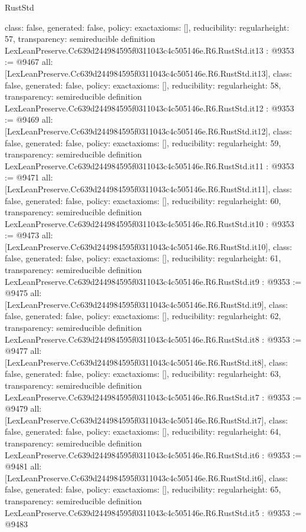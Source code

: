 \begin{lexlean}{RustStd}
\begin{coremodule}
{  class: false,
  generated: false,
  policy: exact{axioms: []},
  reducibility: regular{height: 57},
  transparency: semireducible
}
definition LexLeanPreserve.Cc639d244984595f0311043c4c505146e.R6.RustStd.it13 : @9353 := @9467 {
  all: [LexLeanPreserve.Cc639d244984595f0311043c4c505146e.R6.RustStd.it13],
  class: false,
  generated: false,
  policy: exact{axioms: []},
  reducibility: regular{height: 58},
  transparency: semireducible
}
definition LexLeanPreserve.Cc639d244984595f0311043c4c505146e.R6.RustStd.it12 : @9353 := @9469 {
  all: [LexLeanPreserve.Cc639d244984595f0311043c4c505146e.R6.RustStd.it12],
  class: false,
  generated: false,
  policy: exact{axioms: []},
  reducibility: regular{height: 59},
  transparency: semireducible
}
definition LexLeanPreserve.Cc639d244984595f0311043c4c505146e.R6.RustStd.it11 : @9353 := @9471 {
  all: [LexLeanPreserve.Cc639d244984595f0311043c4c505146e.R6.RustStd.it11],
  class: false,
  generated: false,
  policy: exact{axioms: []},
  reducibility: regular{height: 60},
  transparency: semireducible
}
definition LexLeanPreserve.Cc639d244984595f0311043c4c505146e.R6.RustStd.it10 : @9353 := @9473 {
  all: [LexLeanPreserve.Cc639d244984595f0311043c4c505146e.R6.RustStd.it10],
  class: false,
  generated: false,
  policy: exact{axioms: []},
  reducibility: regular{height: 61},
  transparency: semireducible
}
definition LexLeanPreserve.Cc639d244984595f0311043c4c505146e.R6.RustStd.it9 : @9353 := @9475 {
  all: [LexLeanPreserve.Cc639d244984595f0311043c4c505146e.R6.RustStd.it9],
  class: false,
  generated: false,
  policy: exact{axioms: []},
  reducibility: regular{height: 62},
  transparency: semireducible
}
definition LexLeanPreserve.Cc639d244984595f0311043c4c505146e.R6.RustStd.it8 : @9353 := @9477 {
  all: [LexLeanPreserve.Cc639d244984595f0311043c4c505146e.R6.RustStd.it8],
  class: false,
  generated: false,
  policy: exact{axioms: []},
  reducibility: regular{height: 63},
  transparency: semireducible
}
definition LexLeanPreserve.Cc639d244984595f0311043c4c505146e.R6.RustStd.it7 : @9353 := @9479 {
  all: [LexLeanPreserve.Cc639d244984595f0311043c4c505146e.R6.RustStd.it7],
  class: false,
  generated: false,
  policy: exact{axioms: []},
  reducibility: regular{height: 64},
  transparency: semireducible
}
definition LexLeanPreserve.Cc639d244984595f0311043c4c505146e.R6.RustStd.it6 : @9353 := @9481 {
  all: [LexLeanPreserve.Cc639d244984595f0311043c4c505146e.R6.RustStd.it6],
  class: false,
  generated: false,
  policy: exact{axioms: []},
  reducibility: regular{height: 65},
  transparency: semireducible
}
definition LexLeanPreserve.Cc639d244984595f0311043c4c505146e.R6.RustStd.it5 : @9353 := @9483 {
}
\end{coremodule}
\end{lexlean}
